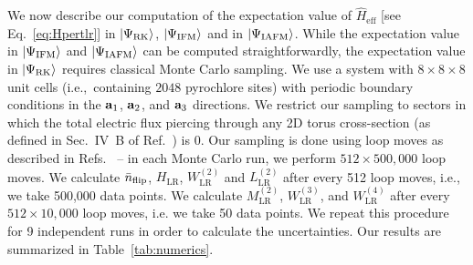 \documentclass[twocolumn,superscriptaddress,amsmath,amssymb,aps,prx,nofootinbib]{revtex4-2}
\begin{document}
We now describe our computation of the expectation value of $\hat{H}_{\text{eff}}$ [see Eq.~\eqref{eq:Hpertlr}] in $\ket{\Psi_{\text{RK}}}$, $\ket{\Psi_{\text{IFM}}}$ and in $\ket{\Psi_{\text{IAFM}}}$. While the expectation value in $\ket{\Psi_{\text{IFM}}}$ and $\ket{\Psi_{\text{IAFM}}}$ can be computed straightforwardly, the expectation value in $\ket{\Psi_{\text{RK}}}$ requires classical Monte Carlo sampling. We use a system with $8 \times 8 \times 8$ unit cells (i.e.,~containing $2048$ pyrochlore sites) with periodic boundary conditions in the $\vb{a}_1$, $\vb{a}_2$, and $\vb{a}_3$ directions.  
We restrict our sampling to sectors in which the total electric flux piercing through any 2D torus cross-section (as defined in Sec.~IV~B of Ref.~\cite{hermele2004}) is 0. Our sampling is done using loop moves as described in Refs.~\cite{hermele2004,melko2001long,melko2004monte} -- in each Monte Carlo run, we perform $512\times 500,000$ loop moves. We calculate $\Bar{n}_{\text{flip}}$, $H_{\text{LR}}$, $W^{(2)}_{\text{LR}}$ and $L^{(2)}_{\text{LR}}$ after every 512 loop moves, i.e., we take 500,000 data points. We calculate $M^{(2)}_{\text{LR}}$, $W^{(3)}_{\text{LR}}$, and $W^{(4)}_{\text{LR}}$ after every $512\times 10,000$ loop moves, i.e. we take 50 data points. We repeat this procedure for 9 independent runs in order to calculate the uncertainties. Our results are summarized in Table~\ref{tab:numerics}. 
\end{document}
